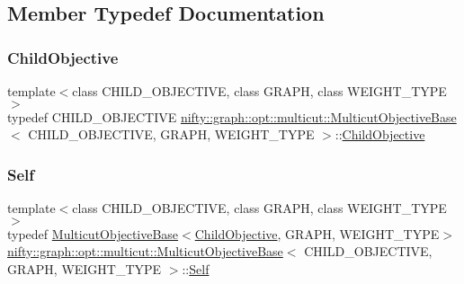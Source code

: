 \subsection{Member Typedef Documentation}
\mbox{\label{classnifty_1_1graph_1_1opt_1_1multicut_1_1MulticutObjectiveBase_a5acf025b98f33ce503ddd157c3f56a53}} 
\subsubsection{\texorpdfstring{Child\+Objective}{ChildObjective}}
{\footnotesize\ttfamily template$<$class C\+H\+I\+L\+D\+\_\+\+O\+B\+J\+E\+C\+T\+I\+VE, class G\+R\+A\+PH, class W\+E\+I\+G\+H\+T\+\_\+\+T\+Y\+PE$>$ \\
typedef C\+H\+I\+L\+D\+\_\+\+O\+B\+J\+E\+C\+T\+I\+VE \hyperlink{classnifty_1_1graph_1_1opt_1_1multicut_1_1MulticutObjectiveBase}{nifty\+::graph\+::opt\+::multicut\+::\+Multicut\+Objective\+Base}$<$ C\+H\+I\+L\+D\+\_\+\+O\+B\+J\+E\+C\+T\+I\+VE, G\+R\+A\+PH, W\+E\+I\+G\+H\+T\+\_\+\+T\+Y\+PE $>$\+::\hyperlink{classnifty_1_1graph_1_1opt_1_1multicut_1_1MulticutObjectiveBase_a5acf025b98f33ce503ddd157c3f56a53}{Child\+Objective}}

\mbox{\label{classnifty_1_1graph_1_1opt_1_1multicut_1_1MulticutObjectiveBase_a4071799f8254ec6fbc7d0cb5cb141464}} 
\subsubsection{\texorpdfstring{Self}{Self}}
{\footnotesize\ttfamily template$<$class C\+H\+I\+L\+D\+\_\+\+O\+B\+J\+E\+C\+T\+I\+VE, class G\+R\+A\+PH, class W\+E\+I\+G\+H\+T\+\_\+\+T\+Y\+PE$>$ \\
typedef \hyperlink{classnifty_1_1graph_1_1opt_1_1multicut_1_1MulticutObjectiveBase}{Multicut\+Objective\+Base}$<$\hyperlink{classnifty_1_1graph_1_1opt_1_1multicut_1_1MulticutObjectiveBase_a5acf025b98f33ce503ddd157c3f56a53}{Child\+Objective}, G\+R\+A\+PH, W\+E\+I\+G\+H\+T\+\_\+\+T\+Y\+PE$>$ \hyperlink{classnifty_1_1graph_1_1opt_1_1multicut_1_1MulticutObjectiveBase}{nifty\+::graph\+::opt\+::multicut\+::\+Multicut\+Objective\+Base}$<$ C\+H\+I\+L\+D\+\_\+\+O\+B\+J\+E\+C\+T\+I\+VE, G\+R\+A\+PH, W\+E\+I\+G\+H\+T\+\_\+\+T\+Y\+PE $>$\+::\hyperlink{classnifty_1_1graph_1_1opt_1_1multicut_1_1MulticutObjectiveBase_a4071799f8254ec6fbc7d0cb5cb141464}{Self}}



